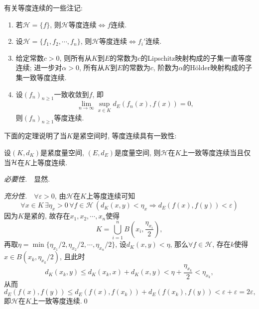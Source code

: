 	\begin{Remark}
	有关等度连续的一些注记:
	\begin{enumerate}[(1)]
	\item 若$ \mathcal H=\{f\} $, 则$ \mathcal H $等度连续$ \Longleftrightarrow f $连续.
	\item 设$ \mathcal H=\{ f_1,f_2,\cdots,f_n \} $, 则$ \mathcal H $等度连续$ \Longleftrightarrow f_i' $连续.
	\item 给定常数$ c>0 $, 则所有从$ K $到$ E $的常数为$ c $的Lipschitz映射构成的子集一直等度连续; 进一步对$ \alpha>0 $, 所有从$ K $到$ E $的常数为$ c $, 阶数为$ \alpha $的H\"older映射构成的子集一致等度连续.
	\item 设$ (f_n)_{n\geqslant 1} $一致收敛到$ f $, 即
	\[
	\lim_{n\to\infty}\sup_{x\in K}d_E(f_n(x),f(x))=0,
	\]
	则$ (f_n)_{n\geqslant 1} $等度连续.
	\end{enumerate}
	\end{Remark}
	
	下面的定理说明了当$ K $是紧空间时, 等度连续具有一致性:
	
	\begin{Theorem}
	设$ (K,d_K) $是紧度量空间, $ (E,d_E) $是度量空间, 则$ \mathcal H $在$ K $上一致等度连续当且仅当$ \mathcal{H} $在$ K $上等度连续.
	\end{Theorem}
	\begin{Proof}
	\textsl{必要性.}\ \ 显然.
	
	\textsl{充分性.}\ \ $ \forall\varepsilon>0 $, 由$ \mathcal H $在$ K $上等度连续可知
	\[
	\forall x\in K\,\exists\eta_x>0\,\forall f\in\mathcal H\,(d_K(x,y)<\eta_x\Rightarrow d_E(f(x),f(y))<\varepsilon)
	\]
	因为$ K $是紧的, 故存在$ x_1,x_2,\cdots,x_n $使得
	\[
	K=\bigcup_{i=1}^nB\left(x_i,\frac{\eta_{x_i}}{2}\right),
	\]
	再取$ \eta=\min\{ \eta_{x_1}/2,\eta_{x_2}/2,\cdots,\eta_{x_n}/2 \} $, 设$ d_K(x,y)<\eta $, 那么$ \forall f\in\mathcal H $, 存在$ k $使得$ x\in B(x_k,\eta_{x_k}/2) $, 且此时
	\[
	d_K(x_k,y)\leqslant d_K(x_k,x)+d_K(x,y)<\eta+\frac{\eta_{x_k}}{2}<\eta_{x_k},
	\]
	从而
	\[
	d_E(f(x),f(y))\leqslant d_E(f(x),f(x_k))+d_E(f(x_k),f(y))<\varepsilon+\varepsilon=2\varepsilon,
	\]
	即$ \mathcal H $在$ K $上一致等度连续.\qed
     \end{Proof}
     
